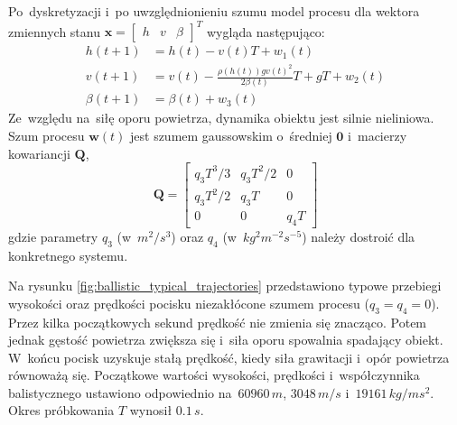 Po~dyskretyzacji i~po uwzględnionieniu szumu model procesu dla wektora zmiennych stanu $\boldsymbol{x}=\begin{bmatrix}
h & v & \beta
\end{bmatrix}^T$ wygląda następująco:
\begin{align}\label{eq:missile_tracking_discretized_model}
	h(t+1) &= h(t) - v(t)T + w_1(t) \nonumber \\
	v(t+1) &= v(t)-\frac{\rho(h(t))gv(t)^2}{2\beta(t)}T + gT + w_2(t) \nonumber \\
	\beta(t+1) &= \beta(t) + w_3(t)
\end{align}
Ze~względu na~siłę oporu powietrza, dynamika obiektu jest silnie nieliniowa. Szum procesu $\boldsymbol{w}(t)$ jest szumem gaussowskim o~średniej $\boldsymbol{0}$ i~macierzy kowariancji $\boldsymbol{Q}$,
\begin{equation}
\boldsymbol{Q} = 
	\begin{bmatrix}
	q_3T^3/3 & q_3T^2/2 & 0 \\
	q_3T^2/2 & q_3T & 0 \\
	0 & 0 & q_4T
	\end{bmatrix}
\end{equation}
gdzie parametry $q_3$ (w~$m^2/s^3$) oraz $q_4$ (w~$kg^2m^{-2}s^{-5}$) należy dostroić dla konkretnego systemu. \par
Na rysunku \ref{fig:ballistic_typical_trajectories} przedstawiono typowe przebiegi wysokości oraz prędkości pocisku niezakłócone szumem procesu ($q_3=q_4=0$). Przez kilka początkowych sekund prędkość nie zmienia się znacząco. Potem jednak gęstość powietrza zwiększa się i~siła oporu spowalnia spadający obiekt. W~końcu pocisk uzyskuje stałą prędkość, kiedy siła grawitacji i~opór powietrza równoważą się. Początkowe wartości wysokości, prędkości i~współczynnika balistycznego ustawiono odpowiednio na~$60960\,m$, $3048\,m/s$ i~$19161\,kg/ms^2$. Okres próbkowania $T$ wynosił $0.1\,s$.\par
